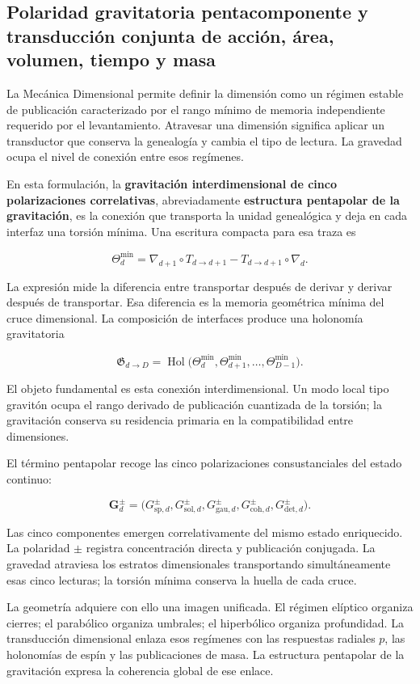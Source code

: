 \subsection{Polaridad gravitatoria pentacomponente y transducción conjunta de acción, área, volumen, tiempo y masa}

La Mecánica Dimensional permite definir la dimensión como un régimen estable de publicación caracterizado por el rango mínimo de memoria independiente requerido por el levantamiento. Atravesar una dimensión significa aplicar un transductor que conserva la genealogía y cambia el tipo de lectura. La gravedad ocupa el nivel de conexión entre esos regímenes.

En esta formulación, la \textbf{gravitación interdimensional de cinco polarizaciones correlativas}, abreviadamente \textbf{estructura pentapolar de la gravitación}, es la conexión que transporta la unidad genealógica y deja en cada interfaz una torsión mínima. Una escritura compacta para esa traza es

\[
\Theta_d^{\min}
=
\nabla_{d+1}\circ T_{d\to d+1}
-
T_{d\to d+1}\circ\nabla_d.
\]

La expresión mide la diferencia entre transportar después de derivar y derivar después de transportar. Esa diferencia es la memoria geométrica mínima del cruce dimensional. La composición de interfaces produce una holonomía gravitatoria

\[
\mathfrak G_{d\to D}
=
\operatorname{Hol}
\bigl(
\Theta_d^{\min},
\Theta_{d+1}^{\min},
\ldots,
\Theta_{D-1}^{\min}
\bigr).
\]

El objeto fundamental es esta conexión interdimensional. Un modo local tipo gravitón ocupa el rango derivado de publicación cuantizada de la torsión; la gravitación conserva su residencia primaria en la compatibilidad entre dimensiones.

El término pentapolar recoge las cinco polarizaciones consustanciales del estado continuo:

\[
\mathbf G_d^{\pm}
=
\bigl(
G_{\mathrm{sp},d}^{\pm},
G_{\mathrm{sol},d}^{\pm},
G_{\mathrm{gau},d}^{\pm},
G_{\mathrm{coh},d}^{\pm},
G_{\mathrm{det},d}^{\pm}
\bigr).
\]

Las cinco componentes emergen correlativamente del mismo estado enriquecido. La polaridad \(\pm\) registra concentración directa y publicación conjugada. La gravedad atraviesa los estratos dimensionales transportando simultáneamente esas cinco lecturas; la torsión mínima conserva la huella de cada cruce.

La geometría adquiere con ello una imagen unificada. El régimen elíptico organiza cierres; el parabólico organiza umbrales; el hiperbólico organiza profundidad. La transducción dimensional enlaza esos regímenes con las respuestas radiales \(p\), las holonomías de espín y las publicaciones de masa. La estructura pentapolar de la gravitación expresa la coherencia global de ese enlace.

